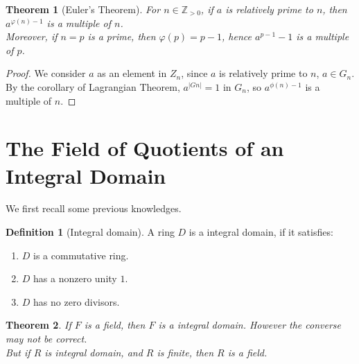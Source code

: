 \documentclass{article}
\theoremstyle{MyNonumberplain}
\theoremstyle{break}
\newtheorem*{proof}{Proof. }
\theoremstyle{break}
\newtheorem{theorem}{Theorem}[section]
\theoremstyle{break}
\theoremstyle{definition}
\theoremstyle{break}
\newtheorem{definition}{Definition}[section]
\begin{document}
\begin{thmbox}
    \begin{theorem}[Euler's Theorem]
        For $n \in \mathbb{Z}_{> 0}$, if $a$ is relatively prime to $n$, then
        $a^{\varphi (n) - 1}$ is a multiple of $n$.\\
        
        Moreover, if $n = p$ is a prime, then $\varphi (p) = p - 1$, hence $a^{p - 1} -
        1$ is a multiple of $p$.

    \end{theorem}
    \begin{prfbox}
        \begin{proof}
            We consider $a$ as an element in $Z_n$, since $a$ is relatively prime to $n$, $a \in G_n$. By the corollary
            of Lagrangian Theorem, $a^{|Gn|} = 1$ in $G_n$, so $a^{\phi(n)-1}$ is a multiple of $n$.
        \end{proof}
    \end{prfbox}
\end{thmbox}

\newpage

\section{The Field of Quotients of an Integral Domain}

We first recall some previous knowledges.

\begin{defbox}
    \begin{definition}[Integral domain]
        A ring $D$ is a integral domain, if it satisfies:\\
        \begin{enumerate}
          \item $D$ is a commutative ring.\\
          
          \item $D$ has a nonzero unity $1$.\\
          
          \item $D$ has no zero divisors.
        \end{enumerate}
    \end{definition}
\end{defbox}

\begin{thmbox}
    \begin{theorem}
        If $F$ is a field, then $F$ is a integral domain. However the converse may not
        be correct.\\
        
        But if $R$ is integral domain, and $R$ is finite, then $R$ is a field.
    \end{theorem}
\end{thmbox}
\end{document}
